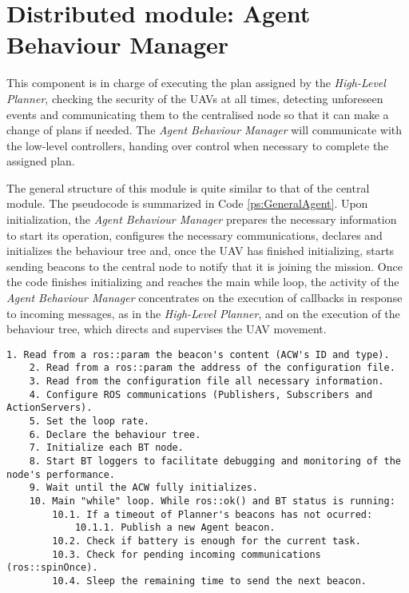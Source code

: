\section{Distributed module: Agent Behaviour Manager}
\label{sec:Distributed module: behavior manager}
This component is in charge of executing the plan assigned by the \emph{High-Level Planner}, checking the security of the \glspl{UAV} at all times, detecting unforeseen events and communicating them to the centralised node so that it can make a change of plans if needed. The \emph{Agent Behaviour Manager} will communicate with the low-level controllers, handing over control when necessary to complete the assigned plan.

The general structure of this module is quite similar to that of the central module. The pseudocode is summarized in Code \ref{ps:GeneralAgent}. Upon initialization, the \emph{Agent Behaviour Manager} prepares the necessary information to start its operation, configures the necessary communications, declares and initializes the behaviour tree and, once the \gls{UAV} has finished initializing, starts sending beacons to the central node to notify that it is joining the mission. Once the code finishes initializing and reaches the main while loop, the activity of the \emph{Agent Behaviour Manager} concentrates on the execution of callbacks in response to incoming messages, as in the \emph{High-Level Planner}, and on the execution of the behaviour tree, which directs and supervises the \gls{UAV} movement.


\begin{lstlisting}[caption={General operation of \emph{Agent Behaviour Manager}}, breaklines=true, label=ps:GeneralAgent]
	1. Read from a ros::param the beacon's content (ACW's ID and type).
	2. Read from a ros::param the address of the configuration file.
	3. Read from the configuration file all necessary information.
	4. Configure ROS communications (Publishers, Subscribers and ActionServers).
	5. Set the loop rate.
	6. Declare the behaviour tree.
	7. Initialize each BT node.
	8. Start BT loggers to facilitate debugging and monitoring of the node's performance.
	9. Wait until the ACW fully initializes.
	10. Main "while" loop. While ros::ok() and BT status is running:
		10.1. If a timeout of Planner's beacons has not ocurred:
			10.1.1. Publish a new Agent beacon.
		10.2. Check if battery is enough for the current task.
		10.3. Check for pending incoming communications (ros::spinOnce).
		10.4. Sleep the remaining time to send the next beacon.
\end{lstlisting}

